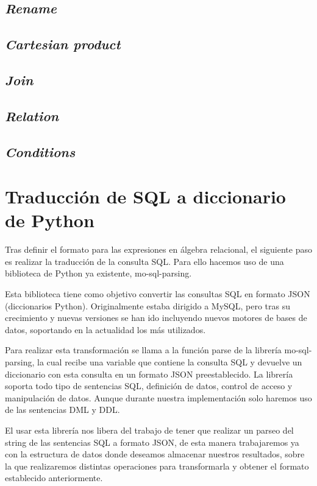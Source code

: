 \subsection{\textit{Rename}}

\subsection{\textit{Cartesian product}}

\subsection{\textit{Join}}

\subsection{\textit{Relation}}

\subsection{\textit{Conditions}}


\section{Traducción de SQL a diccionario de Python}

Tras definir el formato para las expresiones en álgebra relacional, el siguiente paso es realizar la traducción de la consulta SQL. Para ello hacemos uso de una biblioteca de Python ya existente, mo-sql-parsing.

Esta biblioteca tiene como objetivo convertir las consultas SQL en formato JSON (diccionarios Python). Originalmente estaba dirigido a MySQL, pero tras su crecimiento y nuevas versiones se han ido incluyendo nuevos motores de bases de datos, soportando en la actualidad los más utilizados.

Para realizar esta transformación se llama a la función parse de la librería mo-sql-parsing, la cual recibe una variable que contiene la consulta SQL y devuelve un diccionario con esta consulta en un formato JSON preestablecido.
La librería soporta todo tipo de sentencias SQL, definición de datos, control de acceso y manipulación de datos. Aunque durante nuestra implementación solo haremos uso de las sentencias DML y DDL.

El usar esta librería nos libera del trabajo de tener que realizar un parseo del string de las sentencias SQL a formato JSON, de esta manera trabajaremos ya con la estructura de datos donde deseamos almacenar nuestros resultados, sobre la que realizaremos distintas operaciones para transformarla y obtener el formato establecido anteriormente.


